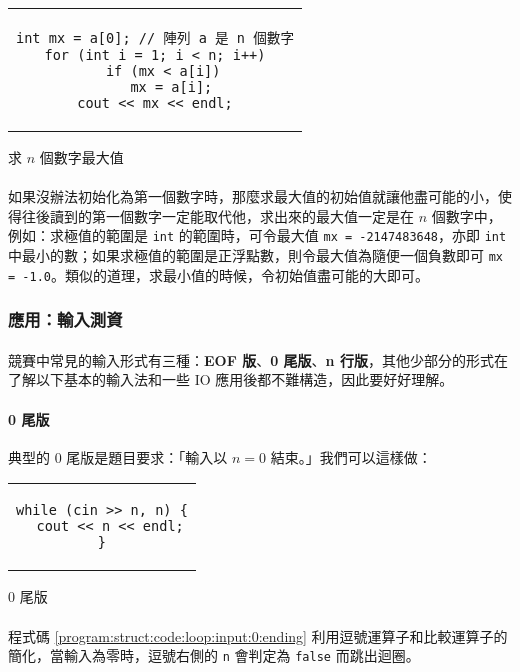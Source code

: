 \documentclass[12pt,a4paper,oneside]{report}
\begin{document}
\begin{CJK}{UTF8}{bkai}
\begin{code}[h!]
\centering
\begin{tabular}{c}
\begin{lstlisting}
int mx = a[0]; // 陣列 a 是 n 個數字
for (int i = 1; i < n; i++)
  if (mx < a[i])
    mx = a[i];
cout << mx << endl;
\end{lstlisting}
\end{tabular}
\caption{求 $n$ 個數字最大值}
\label{program:struct:code:max:for}
\end{code}


\paragraph{}如果沒辦法初始化為第一個數字時，那麼求最大值的初始值就讓他盡可能的小，使得往後讀到的第一個數字一定能取代他，求出來的最大值一定是在 $n$ 個數字中，例如：求極值的範圍是 \lstinline!int! 的範圍時，可令最大值 \lstinline!mx = -2147483648!，亦即 \lstinline!int! 中最小的數；如果求極值的範圍是正浮點數，則令最大值為隨便一個負數即可 \lstinline!mx = -1.0!。類似的道理，求最小值的時候，令初始值盡可能的大即可。

\subsubsection{應用：輸入測資}

\paragraph{}競賽中常見的輸入形式有三種：\textbf{EOF 版}、\textbf{0 尾版}、\textbf{n 行版}，其他少部分的形式在了解以下基本的輸入法和一些 IO 應用後都不難構造，因此要好好理解。

\paragraph{0 尾版}典型的 0 尾版是題目要求：「輸入以 $n = 0$ 結束。」我們可以這樣做：

\begin{code}[h!]
\centering
\begin{tabular}{c}
\begin{lstlisting}
while (cin >> n, n) {
  cout << n << endl;
}
\end{lstlisting}
\end{tabular}
\caption{0 尾版}
\label{program:struct:code:loop:input:0:ending}
\end{code}

\paragraph{}程式碼 \ref{program:struct:code:loop:input:0:ending} 利用逗號運算子和比較運算子的簡化，當輸入為零時，逗號右側的 \lstinline!n! 會判定為 \lstinline!false! 而跳出迴圈。


\end{CJK}
\end{document}
